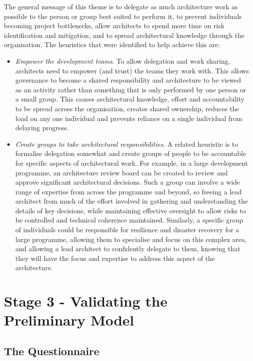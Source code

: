 The general message of this theme is to delegate as much architecture work as possible to the person or group best suited to perform it, to prevent individuals becoming project bottlenecks, allow architects to spend more time on risk identification and mitigation, and to spread architectural knowledge through the organisation.  The heuristics that were identified to help achieve this are:

\begin{itemize}
	\item \emph{Empower the development teams}. To allow delegation and work sharing, architects need to empower (and trust) the teams they work with.  This allows governance to become a shared responsibility and architecture to be viewed as an activity rather than something that is only performed by one person or a small group.  This causes architectural knowledge, effort and accountability to be spread across the organisation, creates shared ownership, reduces the load on any one individual and prevents reliance on a single individual from delaying progress.
	\item \emph{Create groups to take architectural responsibilities}.  A related heuristic is to formalise delegation somewhat and create groups of people to be accountable for specific aspects of architectural work.  For example, in a large development programme, an architecture review board can be created to review and approve significant architectural decisions.  Such a group can involve a wide range of expertise from across the programme and beyond, so freeing a lead architect from much of the effort involved in gathering and understanding the details of key decisions, while maintaining effective oversight to allow risks to be controlled and technical coherence maintained.  Similarly, a specific group of individuals could be responsible for resilience and disaster recovery for a large programme, allowing them to specialise and focus on this complex area, and allowing a lead architect to confidently delegate to them, knowing that they will have the focus and expertise to address this aspect of the architecture.
\end{itemize}

\section{Stage 3 - Validating the Preliminary Model}
\label{sec:validating-prelim-model}
\subsection{The Questionnaire}

